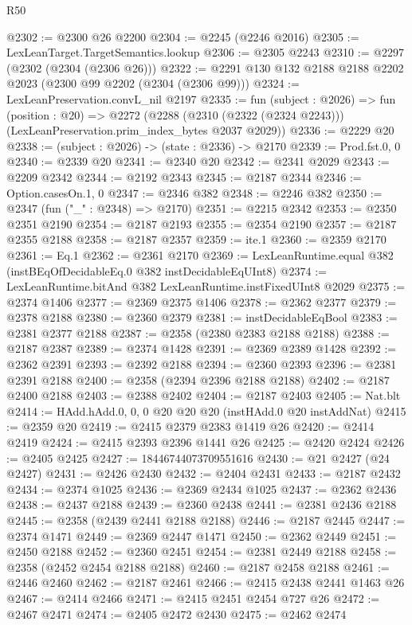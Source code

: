 \begin{lexlean}{R50}
\begin{coremodule}
{{{{{{{{{{{{{{{{{{{{{{{{{{{{{{{{{{{{{{{{{{{{{{{{{{{{{{{{{{{{@2302 := @2300 @26 @2200
@2304 := @2245 (@2246 @2016)
@2305 := LexLeanTarget.TargetSemantics.lookup
@2306 := @2305 @2243
@2310 := @2297 (@2302 (@2304 (@2306 @26)))
@2322 := @2291 @130 @132 @2188 @2188 @2202 @2023 (@2300 @99 @2202 (@2304 (@2306 @99)))
@2324 := LexLeanPreservation.convL_nil @2197
@2335 := fun (subject : @2026) =>
  fun (position : @20) =>
  @2272 (@2288 (@2310 (@2322 (@2324 @2243))) (LexLeanPreservation.prim_index_bytes @2037 @2029))
@2336 := @2229 @20
@2338 := (subject : @2026) -> (state : @2336) -> @2170
@2339 := Prod.fst.{0, 0}
@2340 := @2339 @20
@2341 := @2340 @20
@2342 := @2341 @2029
@2343 := @2209 @2342
@2344 := @2192 @2343
@2345 := @2187 @2344
@2346 := Option.casesOn.{1, 0}
@2347 := @2346 @382
@2348 := @2246 @382
@2350 := @2347 (fun ("_" : @2348) => @2170)
@2351 := @2215 @2342
@2353 := @2350 @2351 @2190
@2354 := @2187 @2193
@2355 := @2354 @2190
@2357 := @2187 @2355 @2188
@2358 := @2187 @2357
@2359 := ite.{1}
@2360 := @2359 @2170
@2361 := Eq.{1}
@2362 := @2361 @2170
@2369 := LexLeanRuntime.equal @382 (instBEqOfDecidableEq.{0} @382 instDecidableEqUInt8)
@2374 := LexLeanRuntime.bitAnd @382 LexLeanRuntime.instFixedUInt8 @2029
@2375 := @2374 @1406
@2377 := @2369 @2375 @1406
@2378 := @2362 @2377
@2379 := @2378 @2188
@2380 := @2360 @2379
@2381 := instDecidableEqBool
@2383 := @2381 @2377 @2188
@2387 := @2358 (@2380 @2383 @2188 @2188)
@2388 := @2187 @2387
@2389 := @2374 @1428
@2391 := @2369 @2389 @1428
@2392 := @2362 @2391
@2393 := @2392 @2188
@2394 := @2360 @2393
@2396 := @2381 @2391 @2188
@2400 := @2358 (@2394 @2396 @2188 @2188)
@2402 := @2187 @2400 @2188
@2403 := @2388 @2402
@2404 := @2187 @2403
@2405 := Nat.blt
@2414 := HAdd.hAdd.{0, 0, 0} @20 @20 @20 (instHAdd.{0} @20 instAddNat)
@2415 := @2359 @20
@2419 := @2415 @2379 @2383 @1419 @26
@2420 := @2414 @2419
@2424 := @2415 @2393 @2396 @1441 @26
@2425 := @2420 @2424
@2426 := @2405 @2425
@2427 := 18446744073709551616
@2430 := @21 @2427 (@24 @2427)
@2431 := @2426 @2430
@2432 := @2404 @2431
@2433 := @2187 @2432
@2434 := @2374 @1025
@2436 := @2369 @2434 @1025
@2437 := @2362 @2436
@2438 := @2437 @2188
@2439 := @2360 @2438
@2441 := @2381 @2436 @2188
@2445 := @2358 (@2439 @2441 @2188 @2188)
@2446 := @2187 @2445
@2447 := @2374 @1471
@2449 := @2369 @2447 @1471
@2450 := @2362 @2449
@2451 := @2450 @2188
@2452 := @2360 @2451
@2454 := @2381 @2449 @2188
@2458 := @2358 (@2452 @2454 @2188 @2188)
@2460 := @2187 @2458 @2188
@2461 := @2446 @2460
@2462 := @2187 @2461
@2466 := @2415 @2438 @2441 @1463 @26
@2467 := @2414 @2466
@2471 := @2415 @2451 @2454 @727 @26
@2472 := @2467 @2471
@2474 := @2405 @2472 @2430
@2475 := @2462 @2474
}}}}}}}}}}}}}}}}}}}}}}}}}}}}}}}}}}}}}}}}}}}}}}}}}}}}}}}}}}}}
\end{coremodule}
\end{lexlean}
